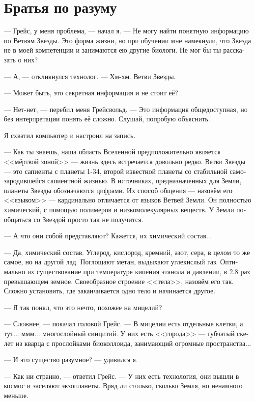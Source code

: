 \documentclass[a4paper,12pt,fleqn]{book}\usepackage{cooltooltips}\usepackage{polyglossia}\setdefaultlanguage[babelshorthands=true]{russian}\setotherlanguage{english}\defaultfontfeatures{Ligatures=TeX,Mapping=tex-text} \usepackage{xcolor}\definecolor{lightgray}{HTML}{bbbbbb}\color{lightgray}\newcommand{\ml}[3]{\textenglish{\textcolor{black}{#3}}}
\begin{document}
{\section{Братья по разуму}

--- Грейс, у меня проблема, --- начал я.
--- Не могу найти понятную информацию по Ветвям Звезды.
Это форма жизни, но при обучении мне намекнули, что Звезда не в моей компетенции и занимаются ею другие биологи.
Не мог бы ты рассказать о них?

--- А, --- откликнулся технолог.
--- Хм-хм.
Ветви Звезды.

--- Может быть, это секретная информация и не стоит её?..

--- Нет-нет, --- перебил меня Грейсвольд.
--- Это информация общедоступная, но без интерпретации понять её сложно.
Слушай, попробую объяснить.

Я схватил компьютер и настроил на запись.

--- Как ты знаешь, наша область Вселенной предположительно является <<мёртвой зоной>> --- жизнь здесь встречается довольно редко.
Ветви Звезды --- это сапиенты с планеты 1-34, второй известной планеты со стабильной самозародившейся сапиентной жизнью.
В источниках, предназначенных для Земли, планеты Звезды обозначаются цифрами.
Их способ общения --- назовём его <<языком>> --- кардинально отличается от языков Ветвей Земли.
Он полностью химический, с помощью полимеров и низкомолекулярных веществ.
У Земли пообщаться со Звездой просто так не получится.

--- А что они собой представляют?
Кажется, их химический состав...

--- Да, химический состав.
Углерод, кислород, кремний, азот, сера, в целом то же самое, но на другой лад.
Поглощают метан, выдыхают углекислый газ.
Оптимально их существование при температуре кипения этанола и давлении, в 2.8 раз превышающем земное.
Своеобразное строение <<тела>>, назовём его так.
Сложно установить, где заканчивается одно тело и начинается другое.

--- Я так понял, что это нечто, похожее на мицелий?

--- Сложнее, --- покачал головой Грейс.
--- В мицелии есть отдельные клетки, а тут... ммм... многослойный синцитий.
У них есть <<города>> --- губчатый скелет из кварца с прослойками биоколлоида, занимающий огромные пространства...

--- И это существо разумное? --- удивился я.

--- Как ни странно, --- ответил Грейс.
--- У них есть технология, они вышли в космос и заселяют экзопланеты.
Вряд ли столько, сколько Земля, но ненамного меньше.

}
\end{document}
